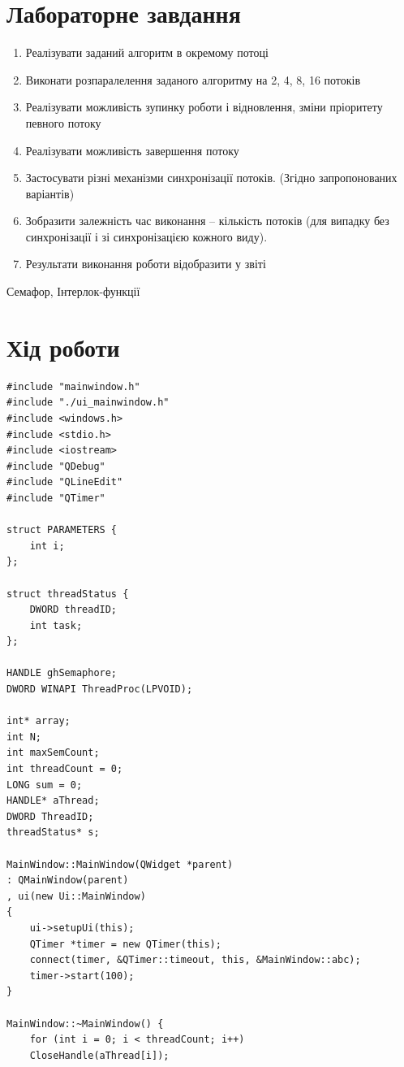 \documentclass{article}
\begin{document}
\begin{normalsize}
	\section*{Лабораторне завдання}
	\begin{enumerate}
		\item Реалізувати заданий алгоритм в окремому потоці
		\item Виконати розпаралелення заданого алгоритму на 2, 4, 8, 16 потоків
		\item Реалізувати можливість зупинку роботи і відновлення, зміни пріоритету
		певного потоку
		\item Реалізувати можливість завершення потоку
		\item Застосувати різні механізми синхронізації потоків. (Згідно запропонованих
		варіантів)
		\item Зобразити залежність час виконання – кількість потоків (для випадку без
		синхронізації і зі синхронізацією кожного виду).
		\item Результати виконання роботи відобразити у звіті
	\end{enumerate}
	\begin{center}
		Семафор, Інтерлок-функції
	\end{center}

	\section*{Хід роботи}	
	\begin{lstlisting}
#include "mainwindow.h"
#include "./ui_mainwindow.h"
#include <windows.h>
#include <stdio.h>
#include <iostream>
#include "QDebug"
#include "QLineEdit"
#include "QTimer"

struct PARAMETERS {
	int i;
};

struct threadStatus {
	DWORD threadID;
	int task;
};

HANDLE ghSemaphore;
DWORD WINAPI ThreadProc(LPVOID);

int* array;
int N;
int maxSemCount;
int threadCount = 0;
LONG sum = 0;
HANDLE* aThread;
DWORD ThreadID;
threadStatus* s;

MainWindow::MainWindow(QWidget *parent)
: QMainWindow(parent)
, ui(new Ui::MainWindow)
{
	ui->setupUi(this);
	QTimer *timer = new QTimer(this);
	connect(timer, &QTimer::timeout, this, &MainWindow::abc);
	timer->start(100);
}

MainWindow::~MainWindow() {
	for (int i = 0; i < threadCount; i++)
	CloseHandle(aThread[i]);
	

\end{lstlisting}
\end{normalsize}
\end{document}
